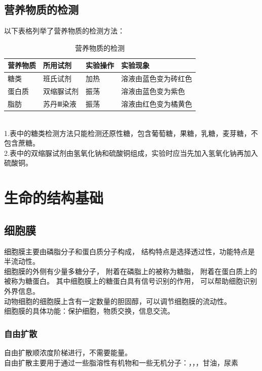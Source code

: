 \documentclass[UTF8]{ctexart}
\begin{document}
\subsection{营养物质的检测}
    以下表格列举了营养物质的检测方法：\vspace{5pt}
    \begin{table}[h]
        \begin{center}
            \begin{tabular}{l|l|l|l}
                \hline
                营养物质\qquad\qquad&所用试剂\qquad\qquad\qquad&实验操作\qquad\qquad&实验现象\qquad\qquad\\ \hline
                糖类&班氏试剂&加热&溶液由蓝色变为砖红色\\ \hline
                蛋白质&双缩脲试剂&振荡&溶液由蓝色变为紫色\\ \hline
                脂肪&苏丹Ⅲ染液&振荡&溶液由红色变为橘黄色\\ \hline
            \end{tabular}
            \caption{营养物质的检测}
        \end{center}
    \end{table}\\
    1.表中的糖类检测方法只能检测还原性糖，包含葡萄糖，果糖，乳糖，麦芽糖，不包含蔗糖。\\[3mm]
    2.表中的双缩脲试剂由氢氧化钠和硫酸铜组成，实验时应当先加入氢氧化钠再加入硫酸铜。

\section{生命的结构基础}

\subsection{细胞膜}
    细胞膜主要由磷脂分子和蛋白质分子构成，
    结构特点是选择透过性，功能特点是半流动性。\\[3mm]
    细胞膜的外侧有少量多糖分子，
    附着在磷脂上的被称为糖脂，
    附着在蛋白质上的被称为糖蛋白。
    其中细胞膜上的糖蛋白具有信号识别的作用，
    可以帮助细胞识别外界信息。\\[3mm]
    动物细胞的细胞膜上含有一定数量的胆固醇，可以调节细胞膜的流动性。\\[3mm]
    细胞膜的具体功能：保护细胞，物质交换，信息交流。

\subsubsection{自由扩散}
    自由扩散顺浓度阶梯进行，不需要能量。\\[2mm]
    自由扩散主要用于通过一些脂溶性有机物和一些无机分子：，，，甘油，尿素
\end{document}
